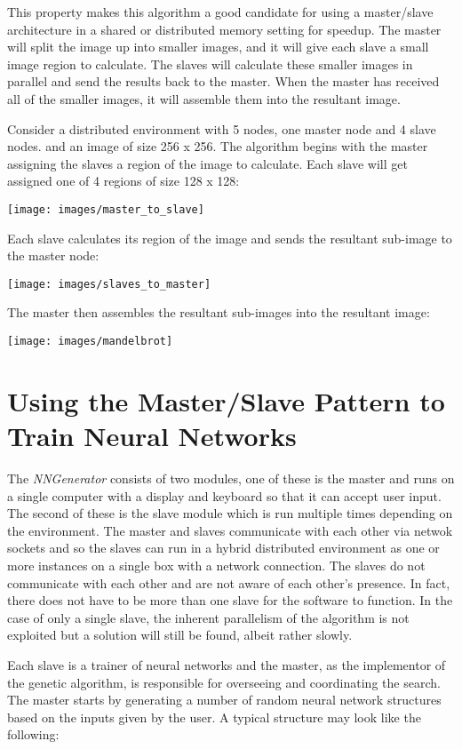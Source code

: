 This property makes this algorithm a good candidate for using a master/slave architecture in a shared or distributed memory setting for speedup. 
The master will split the image up into smaller images, and it will give each slave a small image region to calculate. 
The slaves will calculate these smaller images in parallel and send the results back to the master. 
When the master has received all of the smaller images, it will assemble them into the resultant image.

Consider a distributed environment with 5 nodes, one master node and 4 slave nodes. and an image of size 256 x 256. 
The algorithm begins with the master assigning the slaves a region of the image to calculate. 
Each slave will get assigned one of 4 regions of size 128 x 128:

\texttt{[image: images/master\_to\_slave]}

\newpage
Each slave calculates its region of the image and sends the resultant sub-image to the master node:

\texttt{[image: images/slaves\_to\_master]}
\newpage

The master then assembles the resultant sub-images into the resultant image: 

\texttt{[image: images/mandelbrot]}

\section{Using the Master/Slave Pattern to Train Neural Networks}
The {\em NNGenerator} consists of two modules, one of these is the master and runs on a single computer with a display and keyboard so that it can accept user input.
The second of these is the slave module which is run multiple times depending on the environment.
The master and slaves communicate with each other via netwok sockets and so the slaves can run in a hybrid distributed environment as one or more instances on a single box with a network connection.
The slaves do not communicate with each other and are not aware of each other's presence.
In fact, there does not have to be more than one slave for the software to function.
In the case of only a single slave, the inherent parallelism of the algorithm is not exploited but a solution will still be found, albeit rather slowly.

Each slave is a trainer of neural networks and the master, as the implementor of the genetic algorithm, is responsible for overseeing and coordinating the search.
The master starts by generating a number of random neural network structures based on the inputs given by the user.
A typical structure may look like the following:

